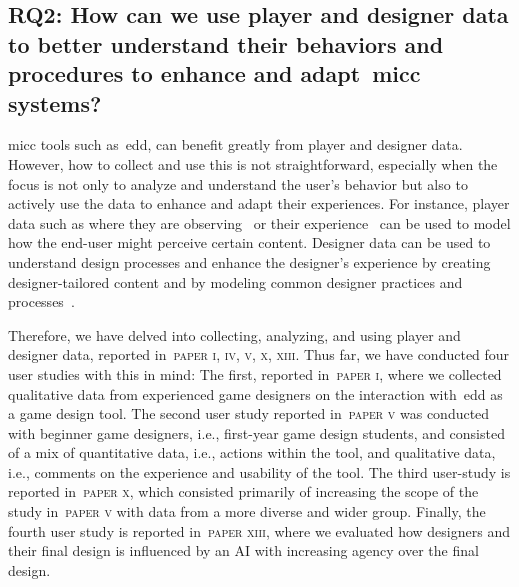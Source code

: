 
\subsection[Research Question 2]{RQ2: How can we use player and designer data to better understand their behaviors and procedures to enhance and adapt~\acrlong{micc} systems?}

\acrlong{micc} tools such as~\acrshort{edd}, can benefit greatly from player and designer data. However, how to collect and use this is not straightforward, especially when the focus is not only to analyze and understand the user's behavior but also to actively use the data to enhance and adapt their experiences. For instance, player data such as where they are observing~\cite{makantasis_pixels_2019} or their experience~\cite{yannakakis_experience-driven_2011} can be used to model how the end-user might perceive certain content. Designer data can be used to understand design processes and enhance the designer's experience by creating designer-tailored content and by modeling common designer practices and processes~\cite{liapis_designer_2013}.

Therefore, we have delved into collecting, analyzing, and using player and designer data, reported in~\textsc{paper i, iv, v, x, xiii}. Thus far, we have conducted four user studies with this in mind: The first, reported in~\textsc{paper i}, where we collected qualitative data from experienced game designers on the interaction with~\acrshort{edd} as a game design tool. The second user study reported in~\textsc{paper v} was conducted with beginner game designers, i.e., first-year game design students, and consisted of a mix of quantitative data, i.e., actions within the tool, and qualitative data, i.e., comments on the experience and usability of the tool. The third user-study is reported in~\textsc{paper x}, which consisted primarily of increasing the scope of the study in~\textsc{paper v} with data from a more diverse and wider group. Finally, the fourth user study is reported in~\textsc{paper xiii}, where we evaluated how designers and their final design is influenced by an AI with increasing agency over the final design.

